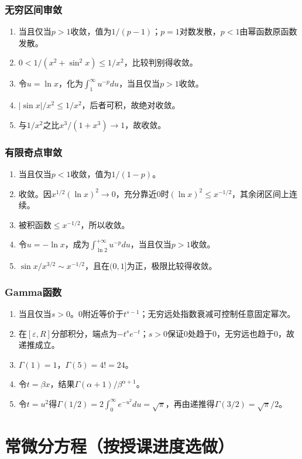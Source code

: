 \documentclass[11pt,a4paper,fontset=fandol]{ctexrep}
\begin{document}
\subsection{无穷区间审敛}
\begin{enumerate}
\item 当且仅当$p>1$收敛，值为$1/(p-1)$；$p=1$对数发散，$p<1$由幂函数原函数发散。
\item $0<1/(x^2+\sin^2x)\le1/x^2$，比较判别得收敛。
\item 令$u=\ln x$，化为$\int_1^\infty u^{-p}du$，当且仅当$p>1$收敛。
\item $|\sin x|/x^2\le1/x^2$，后者可积，故绝对收敛。
\item 与$1/x^2$之比$x^3/(1+x^3)\to1$，故收敛。
\end{enumerate}
\subsection{有限奇点审敛}
\begin{enumerate}
\item 当且仅当$p<1$收敛，值为$1/(1-p)$。
\item 收敛。因$x^{1/2}(\ln x)^2\to0$，充分靠近0时$(\ln x)^2\le x^{-1/2}$，其余闭区间上连续。
\item 被积函数$\le x^{-1/2}$，所以收敛。
\item 令$u=-\ln x$，成为$\int_{\ln2}^{+\infty}u^{-p}du$，当且仅当$p>1$收敛。
\item $\sin x/x^{3/2}\sim x^{-1/2}$，且在$(0,1]$为正，极限比较得收敛。
\end{enumerate}
\subsection{Gamma函数}
\begin{enumerate}
\item 当且仅当$s>0$。0附近等价于$t^{s-1}$；无穷远处指数衰减可控制任意固定幂次。
\item 在$[\varepsilon,R]$分部积分，端点为$-t^se^{-t}$；$s>0$保证0处趋于0，无穷远也趋于0，故递推成立。
\item $\Gamma(1)=1$，$\Gamma(5)=4!=24$。
\item 令$t=\beta x$，结果$\Gamma(\alpha+1)/\beta^{\alpha+1}$。
\item 令$t=u^2$得$\Gamma(1/2)=2\int_0^\infty e^{-u^2}du=\sqrt\pi$，再由递推得$\Gamma(3/2)=\sqrt\pi/2$。
\end{enumerate}
\chapter{常微分方程（按授课进度选做）}
\end{document}
